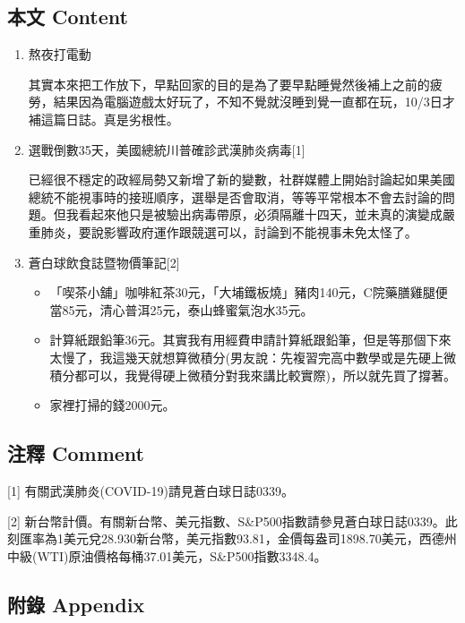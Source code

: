 \documentclass[
]{article}
\providecommand{\tightlist}{%
  \setlength{\itemsep}{0pt}\setlength{\parskip}{0pt}}
\begin{document}
\hypertarget{ux672cux6587-content-1}{%
\subsection{本文 Content}\label{ux672cux6587-content-1}}

\begin{enumerate}
\def\labelenumi{\arabic{enumi}.}
\item
  熬夜打電動

  其實本來把工作放下，早點回家的目的是為了要早點睡覺然後補上之前的疲勞，結果因為電腦遊戲太好玩了，不知不覺就沒睡到覺一直都在玩，10/3日才補這篇日誌。真是劣根性。
\item
  選戰倒數35天，美國總統川普確診武漢肺炎病毒{[}1{]}

  已經很不穩定的政經局勢又新增了新的變數，社群媒體上開始討論起如果美國總統不能視事時的接班順序，選舉是否會取消，等等平常根本不會去討論的問題。但我看起來他只是被驗出病毒帶原，必須隔離十四天，並未真的演變成嚴重肺炎，要說影響政府運作跟競選可以，討論到不能視事未免太怪了。
\item
  蒼白球飲食誌暨物價筆記{[}2{]}

  \begin{itemize}
  \tightlist
  \item
    「喫茶小舖」咖啡紅茶30元，「大埔鐵板燒」豬肉140元，C院藥膳雞腿便當85元，清心普洱25元，泰山蜂蜜氣泡水35元。
  \item
    計算紙跟鉛筆36元。其實我有用經費申請計算紙跟鉛筆，但是等那個下來太慢了，我這幾天就想算微積分(男友說：先複習完高中數學或是先硬上微積分都可以，我覺得硬上微積分對我來講比較實際)，所以就先買了撐著。
  \item
    家裡打掃的錢2000元。
  \end{itemize}
\end{enumerate}

\hypertarget{ux6ce8ux91cb-comment-1}{%
\subsection{注釋 Comment}\label{ux6ce8ux91cb-comment-1}}

{[}1{]} 有關武漢肺炎(COVID-19)請見蒼白球日誌0339。

{[}2{]}
新台幣計價。有關新台幣、美元指數、S\&P500指數請參見蒼白球日誌0339。此刻匯率為1美元兌28.930新台幣，美元指數93.81，金價每盎司1898.70美元，西德州中級(WTI)原油價格每桶37.01美元，S\&P500指數3348.4。

\hypertarget{ux9644ux9304-appendix-1}{%
\subsection{附錄 Appendix}\label{ux9644ux9304-appendix-1}}
\end{document}
